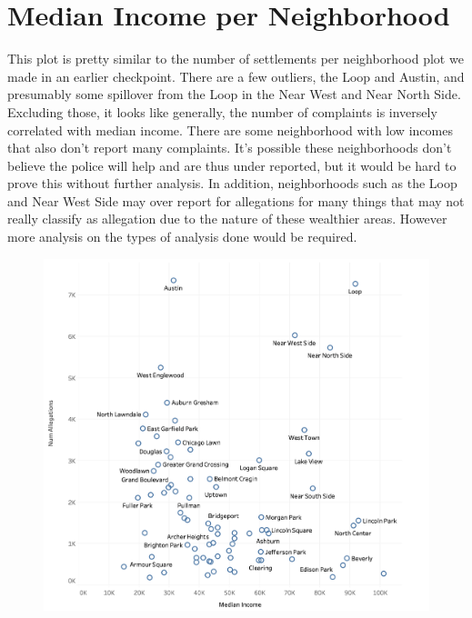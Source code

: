 \documentclass[11pt]{article}
\begin{document}
\FloatBarrier

\section{Median Income per Neighborhood}
This plot is pretty similar to the number of settlements per neighborhood plot we made in an earlier checkpoint. There are a few outliers, the Loop and Austin, and presumably some spillover from the Loop in the Near West and Near North Side. Excluding those, it looks like generally, the number of complaints is inversely correlated with median income. There are some neighborhood with low incomes that also don't report many complaints. It's possible these neighborhoods don't believe the police will help and are thus under reported, but it would be hard to prove this without further analysis. In addition, neighborhoods such as the Loop and Near West Side may over report for allegations for many things that may not really classify as allegation due to the nature of these wealthier areas. However more analysis on the types of analysis done would be required.

\begin{figure}[h]
\includegraphics[width=\textwidth]{scatter.png}
\end{figure}

\FloatBarrier
\end{document}
